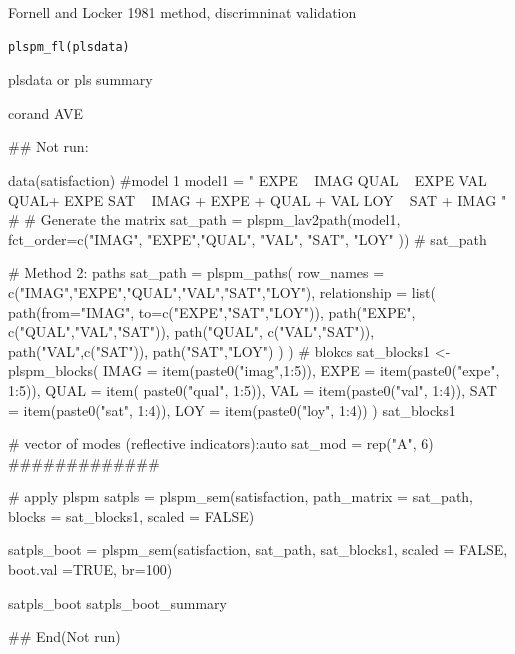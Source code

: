 \documentclass[a4paper]{book}
\begin{document}
%
\begin{Description}
Fornell and Locker 1981 method, discrimninat validation
\end{Description}
%
\begin{Usage}
\begin{verbatim}
plspm_fl(plsdata)
\end{verbatim}
\end{Usage}
%
\begin{Arguments}
\begin{ldescription}
\item[\code{plsdata}] plsdata or pls summary
\end{ldescription}
\end{Arguments}
%
\begin{Value}
corand AVE
\end{Value}
%
\begin{Examples}
\begin{ExampleCode}

\#\# Not run: 

data(satisfaction)
#model 1
model1 = "
EXPE ~ IMAG
QUAL ~ EXPE
VAL ~  QUAL+ EXPE
SAT ~ IMAG + EXPE + QUAL + VAL
LOY ~ SAT + IMAG
"
# # Generate the matrix
sat_path = plspm_lav2path(model1,
                          fct_order=c("IMAG", "EXPE","QUAL", "VAL", "SAT", "LOY" ))
# sat_path

# Method 2: paths
sat_path = plspm_paths(
  row_names = c("IMAG","EXPE","QUAL","VAL","SAT","LOY"),
  relationship = list(
    path(from="IMAG", to=c("EXPE","SAT","LOY")),
    path("EXPE", c("QUAL","VAL","SAT")),
    path("QUAL", c("VAL","SAT")),
    path("VAL",c("SAT")),
    path("SAT","LOY")
  )
)
# blokcs
sat_blocks1 <- plspm_blocks(
  IMAG = item(paste0("imag",1:5)),
  EXPE = item(paste0("expe", 1:5)),
  QUAL = item( paste0("qual", 1:5)),
  VAL = item(paste0("val", 1:4)),
  SAT = item(paste0("sat", 1:4)),
  LOY = item(paste0("loy", 1:4))
)
sat_blocks1

# vector of modes (reflective indicators):auto
sat_mod = rep("A", 6)
#############

# apply plspm
satpls = plspm_sem(satisfaction,
                   path_matrix = sat_path,
                   blocks = sat_blocks1,
                   scaled = FALSE)

satpls_boot = plspm_sem(satisfaction, sat_path, sat_blocks1, scaled = FALSE,
                        boot.val =TRUE, br=100)

satpls_boot %
satpls_boot_summary %


## End(Not run)
\end{ExampleCode}
\end{Examples}
\end{document}
